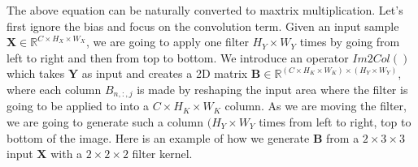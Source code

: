\documentclass[authordraft=true,dvipsnames]{acmart}
\newcommand{\bx}[0]{\mathbf{X}}
\newcommand{\by}[0]{\mathbf{Y}}
\newcommand{\bb}[0]{\mathbf{B}}
\begin{document}
The above equation can be naturally converted to maxtrix multiplication. Let's first ignore the bias and focus on the convolution term. Given an input sample $\bx \in \mathbb{R}^{C \times H_X \times W_X}$, we are going to apply one filter $H_Y \times W_Y$ times by going from left to right and then from top to bottom. We introduce an operator $Im2Col()$ which takes  $\by$ as input and creates a 2D matrix $\bb \in \mathbb{R}^{(C \times H_K \times W_K) \times (H_Y \times W_Y)}$, where each column $B_{n,:,j}$ is made by reshaping the input area where the filter is going to be applied to into a $C \times H_K \times W_K$ column. As we are moving the filter, we are going to generate such a column $(H_Y \times W_Y$ times from left to right, top to bottom of the image. Here is an example of how we generate $\mathbf{B}$ from a $2 \times 3 \times 3$ input $\mathbf{X}$ with a $2 \times 2 \times 2$ filter kernel. 
\end{document}
